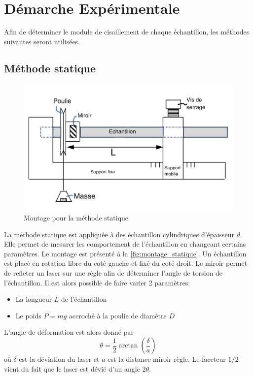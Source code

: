 \section{Démarche Expérimentale}

Afin de déterminer le module de cisaillement de chaque échantillon, les méthodes suivantes seront utilisées.

\subsection{Méthode statique}

\begin{figure}[h]
    \centering
    \includegraphics[width=0.6\linewidth]{figures/statique_annotated.png}
    \caption{Montage pour la méthode statique \cite{notice}}
    \label{fig:montage_statique}
\end{figure}

La méthode statique est appliquée à des échantillon cylindriques d'épaisseur $d$. Elle permet de mesurer les comportement de l'échantillon en changeant certains paramètres. Le montage est présenté à la \autoref{fig:montage_statique}. Un échantillon est placé en rotation libre du coté gauche et fixé du coté droit. Le miroir permet de refleter un laser sur une règle afin de déterminer l'angle de torsion de l'échantillon. Il est alors possible de faire varier 2 paramètres:
\begin{itemize}
    \item La longueur $L$ de l'échantillon
    \item Le poids $P=mg$ accroché à la poulie de diamètre $D$
\end{itemize}
L'angle de déformation est alors donné par
\begin{equation}
    \theta = \frac{1}{2}\arctan\left(\frac{\delta}{a}\right)
    \label{eq:angle_deformation}
\end{equation}
où $\delta$ est la déviation du laser et $a$ est la distance miroir-règle. Le faceteur $1/2$ vient du fait  que le laser est dévié d'un angle $2\theta$.

